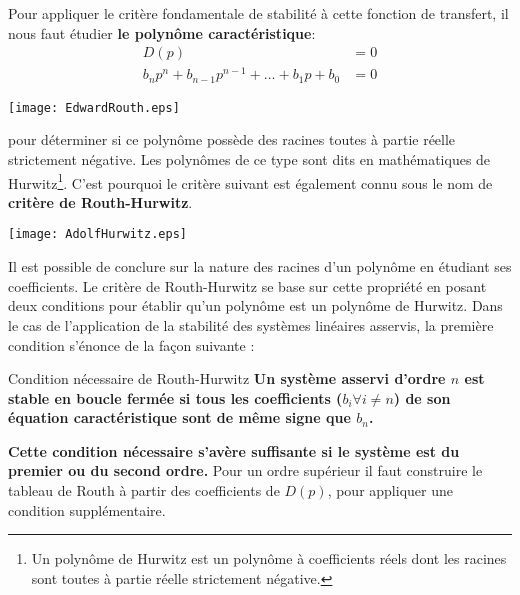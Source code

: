 Pour appliquer le critère fondamentale de stabilité à cette fonction de 
transfert, il nous faut étudier \textbf{le polynôme caractéristique}:
\begin{align}
    D(p)&=0 \nonumber\\
    b_np^n+b_{n-1}p^{n-1}+\ldots+b_1p+b_0 &= 0
\end{align}
\begin{marginfigure}
    \centering
    \texttt{[image: EdwardRouth.eps]} 
    \caption*{Edward John Routh (1831-1907), 
             mathématicien anglais.}
\end{marginfigure}
pour déterminer si ce polynôme possède des racines toutes à partie réelle 
strictement négative. Les polynômes de ce type sont dits en mathématiques 
de Hurwitz\footnote{Un polynôme de Hurwitz est un polynôme à 
coefficients réels dont les racines sont toutes à partie réelle strictement 
négative.}.
C'est pourquoi le critère suivant est également connu sous le nom de 
\textbf{critère de Routh-Hurwitz}.
\begin{marginfigure}
    \centering
    \texttt{[image: AdolfHurwitz.eps]} 
    \caption*{Adolf Hurwitz (1859-1919),
    mathématicien allemand.}
\end{marginfigure}
Il est possible de conclure sur la nature des racines d'un polynôme 
en étudiant ses coefficients. Le critère de Routh-Hurwitz se base sur 
cette propriété en posant deux conditions pour établir qu'un polynôme est 
un polynôme de Hurwitz. Dans le cas de l'application de la stabilité des 
systèmes linéaires asservis, la première condition s'énonce 
de la façon suivante :
\begin{criteria}{Condition nécessaire de Routh-Hurwitz }
    \textbf{Un système asservi d'ordre $n$ est stable en boucle fermée 
    si tous les coefficients ($b_i\forall i\neq n$) de son équation 
    caractéristique sont de même signe que $b_n$.}
\end{criteria}
\textbf{Cette condition nécessaire s'avère suffisante si le système est du 
premier ou du second ordre.} Pour un ordre supérieur il faut construire le 
tableau de Routh à partir des coefficients de $D(p)$,
pour appliquer une condition supplémentaire. 
